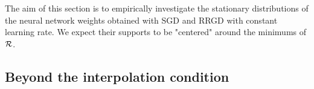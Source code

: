 \documentclass[article,authoryear,jmlmc]{beg_32}             %
\begin{document}
The aim of this section is to empirically investigate the stationary distributions of the neural network weights obtained with SGD and RRGD with constant learning rate. 
We expect their supports to be "centered" around the minimums of $\mathcal{R}$. 

\subsection{Beyond the interpolation condition}
\label{subsection_beyond_interpolation}

\end{document}
